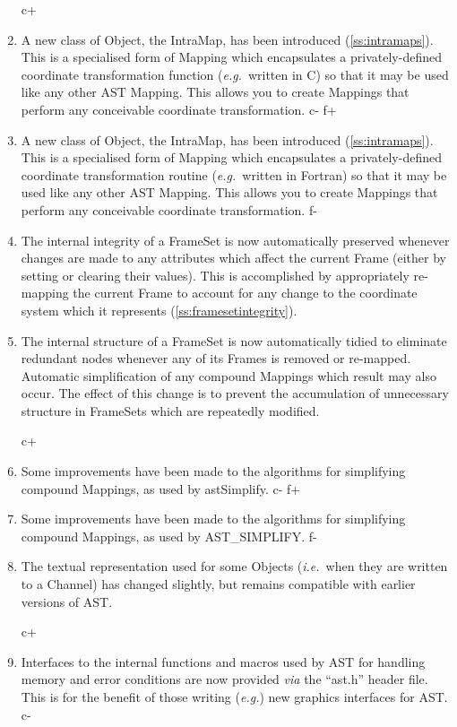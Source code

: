 \documentclass[twoside,11pt]{article}
\newcommand{\secref}[1]{\S\ref{#1}}
\renewcommand{\secref}[1]{\ref{#1}}
\begin{document}
\begin{enumerate}
c+
\item A new class of Object, the IntraMap, has been introduced
(\secref{ss:intramaps}). This is a specialised form of Mapping which
encapsulates a privately-defined coordinate transformation function
({\em{e.g.}}\ written in C) so that it may be used like any other AST
Mapping. This allows you to create Mappings that perform any
conceivable coordinate transformation.
c-
f+
\item A new class of Object, the IntraMap, has been introduced
(\secref{ss:intramaps}). This is a specialised form of Mapping which
encapsulates a privately-defined coordinate transformation routine
({\em{e.g.}}\ written in Fortran) so that it may be used like any
other AST Mapping. This allows you to create Mappings that perform any
conceivable coordinate transformation.
f-

\item The internal integrity of a FrameSet is now automatically
preserved whenever changes are made to any attributes which affect the
current Frame (either by setting or clearing their values). This is
accomplished by appropriately re-mapping the current Frame to account
for any change to the coordinate system which it represents
(\secref{ss:framesetintegrity}).

\item The internal structure of a FrameSet is now automatically tidied
to eliminate redundant nodes whenever any of its Frames is removed or
re-mapped. Automatic simplification of any compound Mappings which
result may also occur. The effect of this change is to prevent the
accumulation of unnecessary structure in FrameSets which are
repeatedly modified.

c+
\item Some improvements have been made to the algorithms for
simplifying compound Mappings, as used by astSimplify.
c-
f+
\item Some improvements have been made to the algorithms for
simplifying compound Mappings, as used by AST\_SIMPLIFY.
f-

\item The textual representation used for some Objects
({\em{i.e.}}\ when they are written to a Channel) has changed
slightly, but remains compatible with earlier versions of AST.

c+
\item Interfaces to the internal functions and macros used by AST for
handling memory and error conditions are now provided {\em{via}} the
``ast.h'' header file. This is for the benefit of those writing
({\em{e.g.}}) new graphics interfaces for AST.
c-


\end{enumerate}
\end{document}
